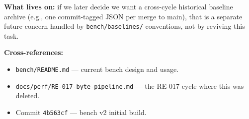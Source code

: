 \textbf{What lives on:} if we later decide we want a cross-cycle historical baseline archive (e.g., one commit-tagged JSON per merge to main), that is a separate future concern handled by \texttt{b\allowbreak{}e\allowbreak{}n\allowbreak{}c\allowbreak{}h\allowbreak{}/\allowbreak{}b\allowbreak{}a\allowbreak{}s\allowbreak{}e\allowbreak{}l\allowbreak{}i\allowbreak{}n\allowbreak{}e\allowbreak{}s\allowbreak{}/} conventions, not by reviving this task.

\textbf{Cross-references:}

\begin{itemize}
\tightlist
\item
  \texttt{b\allowbreak{}e\allowbreak{}n\allowbreak{}c\allowbreak{}h\allowbreak{}/\allowbreak{}R\allowbreak{}E\allowbreak{}A\allowbreak{}D\allowbreak{}M\allowbreak{}E\allowbreak{}.\allowbreak{}m\allowbreak{}d} --- current bench design and usage.
\item
  \texttt{d\allowbreak{}o\allowbreak{}c\allowbreak{}s\allowbreak{}/\allowbreak{}p\allowbreak{}e\allowbreak{}r\allowbreak{}f\allowbreak{}/\allowbreak{}R\allowbreak{}E\allowbreak{}-\allowbreak{}0\allowbreak{}1\allowbreak{}7\allowbreak{}-\allowbreak{}b\allowbreak{}y\allowbreak{}t\allowbreak{}e\allowbreak{}-\allowbreak{}p\allowbreak{}i\allowbreak{}p\allowbreak{}e\allowbreak{}l\allowbreak{}i\allowbreak{}n\allowbreak{}e\allowbreak{}.\allowbreak{}m\allowbreak{}d} --- the RE-017 cycle where this was deleted.
\item
  Commit \texttt{4\allowbreak{}b\allowbreak{}5\allowbreak{}6\allowbreak{}3\allowbreak{}c\allowbreak{}f} --- bench v2 initial build.
\end{itemize}

